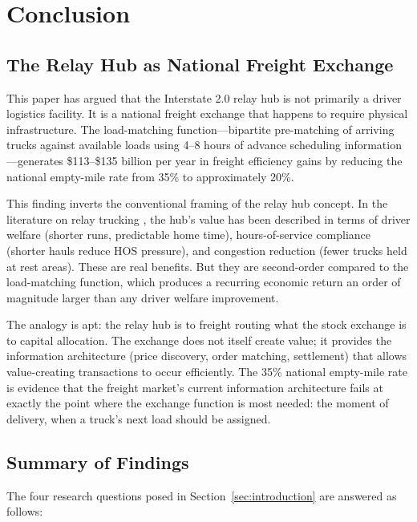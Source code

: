 \section{Conclusion}
\label{sec:conclusion}

\subsection{The Relay Hub as National Freight Exchange}

This paper has argued that the Interstate 2.0 relay hub is not primarily a driver logistics facility. It is a national freight exchange that happens to require physical infrastructure. The load-matching function---bipartite pre-matching of arriving trucks against available loads using 4--8 hours of advance scheduling information---generates \$113--\$135 billion per year in freight efficiency gains by reducing the national empty-mile rate from 35\% to approximately 20\%.

This finding inverts the conventional framing of the relay hub concept. In the literature on relay trucking \citep{ROUTE_F3, ROUTE_C3}, the hub's value has been described in terms of driver welfare (shorter runs, predictable home time), hours-of-service compliance (shorter hauls reduce HOS pressure), and congestion reduction (fewer trucks held at rest areas). These are real benefits. But they are second-order compared to the load-matching function, which produces a recurring economic return an order of magnitude larger than any driver welfare improvement.

The analogy is apt: the relay hub is to freight routing what the stock exchange is to capital allocation. The exchange does not itself create value; it provides the information architecture (price discovery, order matching, settlement) that allows value-creating transactions to occur efficiently. The 35\% national empty-mile rate is evidence that the freight market's current information architecture fails at exactly the point where the exchange function is most needed: the moment of delivery, when a truck's next load should be assigned.

\subsection{Summary of Findings}

The four research questions posed in Section~\ref{sec:introduction} are answered as follows:

